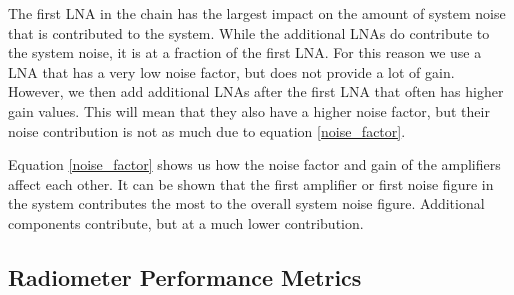 The first LNA in the chain has the largest impact on the amount of system noise that is contributed to the system.  While the additional LNAs do contribute to the system noise, it is at a fraction of the first LNA.  For this reason we use a LNA that has a very low noise factor, but does not provide a lot of gain.  However, we then add additional LNAs after the first LNA that often has higher gain values.  This will mean that they also have a higher noise factor, but their noise contribution is not as much due to equation \ref{noise_factor}.





Equation \ref{noise_factor} shows us how the noise factor and gain of the amplifiers affect each other.  It can be shown that the first amplifier or first noise figure in the system contributes the most to the overall system noise figure.  Additional components contribute, but at a much lower contribution.

\subsection{Radiometer Performance Metrics}\label{performance_metrics}

